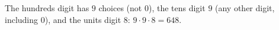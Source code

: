 The hundreds digit has $9$ choices (not $0$), the tens digit $9$ (any other digit, including $0$), and the units digit $8$: $9\cdot9\cdot8=\boxed{648}$.
